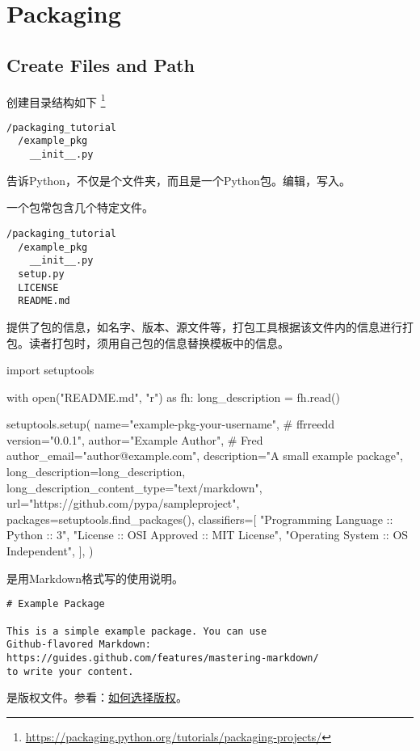 \section{Packaging}
\subsection{Create Files and Path}
创建目录结构如下
\footnote{\url{https://packaging.python.org/tutorials/packaging-projects/}}
\begin{framed}
\begin{verbatim}
/packaging_tutorial
  /example_pkg
    __init__.py
\end{verbatim}
\end{framed}
告诉Python，不仅是个文件夹，而且是一个Python包。编辑，写入。

一个包常包含几个特定文件。
\begin{framed}
\begin{verbatim}
/packaging_tutorial
  /example_pkg
    __init__.py
  setup.py
  LICENSE
  README.md
\end{verbatim}
\end{framed}
提供了包的信息，如名字、版本、源文件等，打包工具根据该文件内的信息进行打包。读者打包时，须用自己包的信息替换模板中的信息。
\begin{python}
import setuptools

with open("README.md", "r") as fh:
    long_description = fh.read()

setuptools.setup(
    name="example-pkg-your-username", # ffrreedd
    version="0.0.1",
    author="Example Author", # Fred
    author_email="author@example.com",
    description="A small example package",
    long_description=long_description,
    long_description_content_type="text/markdown",
    url="https://github.com/pypa/sampleproject",
    packages=setuptools.find_packages(),
    classifiers=[
        "Programming Language :: Python :: 3",
        "License :: OSI Approved :: MIT License",
        "Operating System :: OS Independent",
    ],
)
\end{python}
是用Markdown格式写的使用说明。
\begin{framed}
\begin{verbatim}
# Example Package

This is a simple example package. You can use
Github-flavored Markdown:
https://guides.github.com/features/mastering-markdown/
to write your content.
\end{verbatim}
\end{framed}
是版权文件。参看：\href{https://choosealicense.com/}{如何选择版权}。

